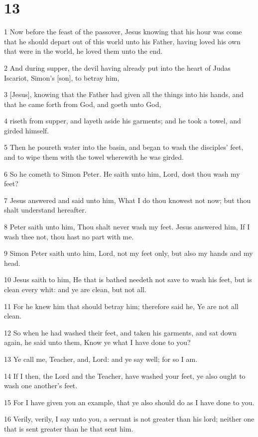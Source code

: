 \chapter{13}

\par 1 Now before the feast of the passover, Jesus knowing that his hour was come that he should depart out of this world unto his Father, having loved his own that were in the world, he loved them unto the end.
\par 2 And during supper, the devil having already put into the heart of Judas Iscariot, Simon's [son], to betray him,
\par 3 [Jesus], knowing that the Father had given all the things into his hands, and that he came forth from God, and goeth unto God,
\par 4 riseth from supper, and layeth aside his garments; and he took a towel, and girded himself.
\par 5 Then he poureth water into the basin, and began to wash the disciples' feet, and to wipe them with the towel wherewith he was girded.
\par 6 So he cometh to Simon Peter. He saith unto him, Lord, dost thou wash my feet?
\par 7 Jesus answered and said unto him, What I do thou knowest not now; but thou shalt understand hereafter.
\par 8 Peter saith unto him, Thou shalt never wash my feet. Jesus answered him, If I wash thee not, thou hast no part with me.
\par 9 Simon Peter saith unto him, Lord, not my feet only, but also my hands and my head.
\par 10 Jesus saith to him, He that is bathed needeth not save to wash his feet, but is clean every whit: and ye are clean, but not all.
\par 11 For he knew him that should betray him; therefore said he, Ye are not all clean.
\par 12 So when he had washed their feet, and taken his garments, and sat down again, he said unto them, Know ye what I have done to you?
\par 13 Ye call me, Teacher, and, Lord: and ye say well; for so I am.
\par 14 If I then, the Lord and the Teacher, have washed your feet, ye also ought to wash one another's feet.
\par 15 For I have given you an example, that ye also should do as I have done to you.
\par 16 Verily, verily, I say unto you, a servant is not greater than his lord; neither one that is sent greater than he that sent him.

